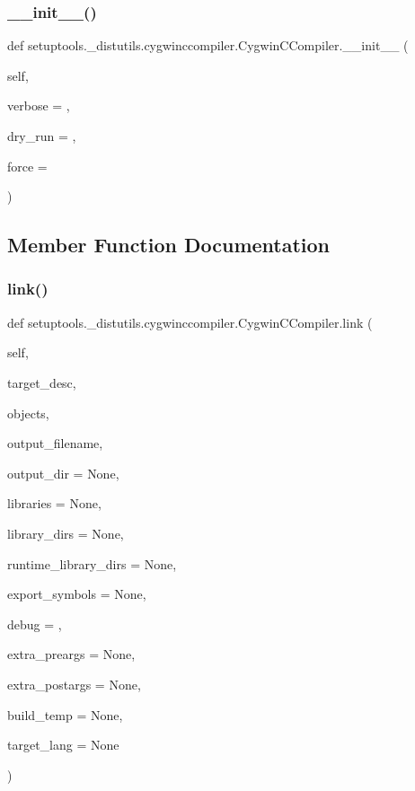 \subsubsection{\texorpdfstring{\+\_\+\+\_\+init\+\_\+\+\_\+()}{\_\_init\_\_()}}
{\footnotesize\ttfamily def setuptools.\+\_\+distutils.\+cygwinccompiler.\+Cygwin\+C\+Compiler.\+\_\+\+\_\+init\+\_\+\+\_\+ (\begin{DoxyParamCaption}\item[{}]{self,  }\item[{}]{verbose = {},  }\item[{}]{dry\+\_\+run = {},  }\item[{}]{force = {} }\end{DoxyParamCaption})}



\subsection{Member Function Documentation}
\mbox{\label{classsetuptools_1_1__distutils_1_1cygwinccompiler_1_1CygwinCCompiler_adf60750f2fa91bae514c22f726a80768}} 
\subsubsection{\texorpdfstring{link()}{link()}}
{\footnotesize\ttfamily def setuptools.\+\_\+distutils.\+cygwinccompiler.\+Cygwin\+C\+Compiler.\+link (\begin{DoxyParamCaption}\item[{}]{self,  }\item[{}]{target\+\_\+desc,  }\item[{}]{objects,  }\item[{}]{output\+\_\+filename,  }\item[{}]{output\+\_\+dir = {\ttfamily None},  }\item[{}]{libraries = {\ttfamily None},  }\item[{}]{library\+\_\+dirs = {\ttfamily None},  }\item[{}]{runtime\+\_\+library\+\_\+dirs = {\ttfamily None},  }\item[{}]{export\+\_\+symbols = {\ttfamily None},  }\item[{}]{debug = {},  }\item[{}]{extra\+\_\+preargs = {\ttfamily None},  }\item[{}]{extra\+\_\+postargs = {\ttfamily None},  }\item[{}]{build\+\_\+temp = {\ttfamily None},  }\item[{}]{target\+\_\+lang = {\ttfamily None} }\end{DoxyParamCaption})}

